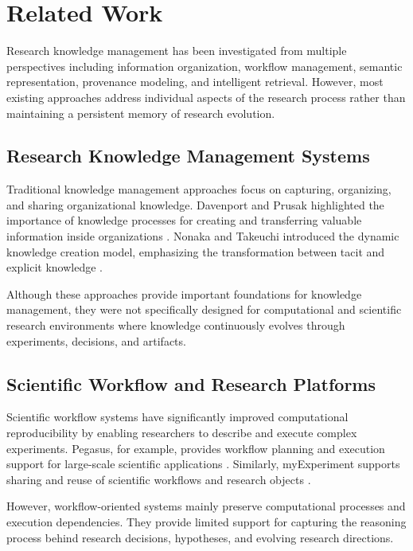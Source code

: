 \section{Related Work}
\label{sec:related_work}


Research knowledge management has been investigated from multiple
perspectives including information organization, workflow management,
semantic representation, provenance modeling, and intelligent retrieval.
However, most existing approaches address individual aspects of the
research process rather than maintaining a persistent memory of research
evolution.


\subsection{Research Knowledge Management Systems}

Traditional knowledge management approaches focus on capturing,
organizing, and sharing organizational knowledge. Davenport and Prusak
highlighted the importance of knowledge processes for creating and
transferring valuable information inside organizations
\cite{davenport1998working}. Nonaka and Takeuchi introduced the dynamic
knowledge creation model, emphasizing the transformation between tacit
and explicit knowledge
\cite{nonaka1994dynamic}.

Although these approaches provide important foundations for knowledge
management, they were not specifically designed for computational and
scientific research environments where knowledge continuously evolves
through experiments, decisions, and artifacts.


\subsection{Scientific Workflow and Research Platforms}

Scientific workflow systems have significantly improved computational
reproducibility by enabling researchers to describe and execute complex
experiments. Pegasus, for example, provides workflow planning and
execution support for large-scale scientific applications
\cite{deelman2009pegasus}. Similarly, myExperiment supports sharing and
reuse of scientific workflows and research objects
\cite{goble2008myexperiment}.

However, workflow-oriented systems mainly preserve computational
processes and execution dependencies. They provide limited support for
capturing the reasoning process behind research decisions, hypotheses,
and evolving research directions.


